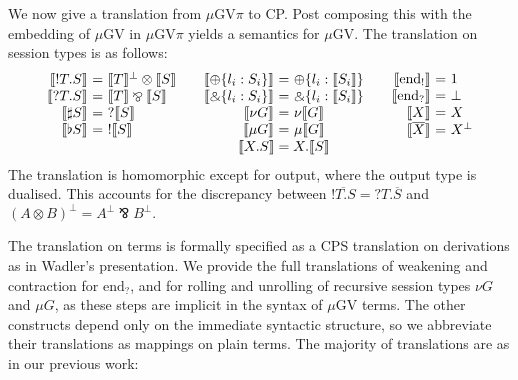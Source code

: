 \documentclass[orivec,envcountsame]{llncs}
\makeatletter
\newcommand{\with}{\mathbin\binampersand}
\newcommand{\parr}{\mathbin\bindnasrepma}
\newcommand{\cpdual}[1]{#1^\perp}
\newcommand{\cpbang}[1]{{! #1}}
\newcommand{\cpquery}[1]{{? #1}}
\newcommand{\gvdual}[1]{\overline{#1}}
\newcommand{\gvout}[2]{{!#1.#2}}
\newcommand{\gvin}[2]{{?#1.#2}}
\newcommand{\outterm}{\mathrm{end}_!}
\newcommand{\interm}{\mathrm{end}_?}
\newcommand{\gvserver}[1]{\flat #1}
\newcommand{\gvservice}[1]{\sharp #1}
\newcommand{\tocp}[1]{\llbracket #1 \rrbracket}
\newcommand{\mugv}{$\mu\mathrm{GV}$\xspace}
\newcommand{\gvpi}{$\mu\mathrm{GV}\pi$\xspace}
\newcommand{\ba}{\begin{array}}
\newcommand{\ea}{\end{array}}
\newenvironment{eqs}{\ba{@{}r@{~}c@{~}l@{}}}{\ea}
\makeatother
\begin{document}
We now give a translation from \gvpi to CP. Post composing this with the embedding of \mugv in \gvpi
yields a semantics for \mugv. The translation on session types is as follows:
\[
\ba{@{}c@{\qquad}c@{\qquad}c@{}}
\begin{eqs}
\tocp{\gvout{T}{S}}        &=& \cpdual{\tocp{T}} \otimes \tocp{S} \\
\tocp{\gvin{T}{S}}         &=& \tocp{T} \parr \tocp{S} \\
\tocp{\gvservice{S}}       &=& \cpquery{\tocp{S}} \\
\tocp{\gvserver{S}}        &=& \cpbang{\tocp{S}} \\
\end{eqs}
&
\begin{eqs}
\tocp{\oplus \{l_i:S_i \}} &=& \oplus \{l_i:\tocp{S_i}\} \\
\tocp{\with \{l_i:S_i \}}  &=& \with \{l_i:\tocp{S_i}\} \\
\tocp{\nu G}               &=& \nu\tocp{G} \\
\tocp{\mu G}               &=& \mu\tocp{G} \\
\end{eqs}
&
\begin{eqs}
\tocp{\outterm}            &=& 1 \\
\tocp{\interm}             &=& \bot \\
\tocp{X}                   &=& X \\
\tocp{\gvdual{X}}          &=& \cpdual{X} \\
\end{eqs}\\
& \tocp{X.S} = X.\tocp{S} & \\
\ea
\]
The translation is homomorphic except for output, where the output type is dualised. This accounts
for the discrepancy between $\gvdual{\gvout{T}{S}} = \gvin{T}{\gvdual{S}}$ and $\cpdual{(A \otimes
  B)} = \cpdual{A} \parr \cpdual{B}.$

The translation on terms is formally specified as a CPS translation on derivations as in Wadler's
presentation. We provide the full translations of weakening and contraction for $\interm$, and for
rolling and unrolling of recursive session types $\nu G$ and $\mu G$, as these steps are implicit in
the syntax of \mugv terms. The other constructs depend only on the immediate syntactic structure, so
we abbreviate their translations as mappings on plain terms.  The majority of translations are as in
our previous work:
\end{document}
